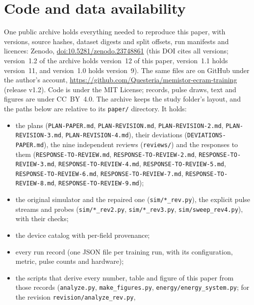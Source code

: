 








\section{Code and data availability}\label{sec:availability}
\begin{sloppypar}
One public archive holds everything needed to reproduce this paper, with versions, source hashes, dataset digests and split
offsets, run manifests and licences: Zenodo, \href{https://doi.org/10.5281/zenodo.23748861}{doi:10.5281/zenodo.23748861}
(this DOI cites all versions; version~1.2 of the archive holds version~12 of this paper, version~1.1 holds version~11, and
version~1.0 holds version~9). The same files are on GitHub under
the author's account, \url{https://github.com/Questeria/memistor-ecram-training} (release v1.2). Code is under the MIT License; records, pulse draws, text and
figures are under CC~BY~4.0. The archive keeps the study folder's layout, and the paths below are relative to its
\texttt{paper/} directory. It holds:
\begin{itemize}
\item the plans (\texttt{PLAN-PAPER.md}, \texttt{PLAN-REVISION.md}, \texttt{PLAN-REVISION-2.md},
      \texttt{PLAN-REVISION-3.md}, \texttt{PLAN-REVISION-4.md}), their deviations (\texttt{DEVIATIONS-PAPER.md}), the nine independent reviews
      (\texttt{reviews/}) and the responses to them (\texttt{RESPONSE-TO-REVIEW.md}, \texttt{RESPONSE-TO-REVIEW-2.md},
      \texttt{RESPONSE-TO-REVIEW-3.md}, \texttt{RESPONSE-TO-REVIEW-4.md}, \texttt{RESPONSE-TO-REVIEW-5.md}, \texttt{RESPONSE-TO-REVIEW-6.md}, \texttt{RESPONSE-TO-REVIEW-7.md}, \texttt{RESPONSE-TO-REVIEW-8.md}, \texttt{RESPONSE-TO-REVIEW-9.md});
\item the original simulator and the repaired one (\texttt{sim/*\_rev.py}), the explicit pulse streams and probes
      (\texttt{sim/*\_rev2.py}, \texttt{sim/*\_rev3.py}, \texttt{sim/sweep\_rev4.py}), with their checks;
\item the device catalog with per-field provenance;
\item every run record (one JSON file per training run, with its configuration, metric, pulse counts and hardware);
\item the scripts that derive every number, table and figure of this paper from those records (\texttt{analyze.py},
      \texttt{make\_figures.py}, \texttt{energy/energy\_system.py}; for the revision \texttt{revision/analyze\_rev.py},

\end{itemize}
\end{sloppypar}
